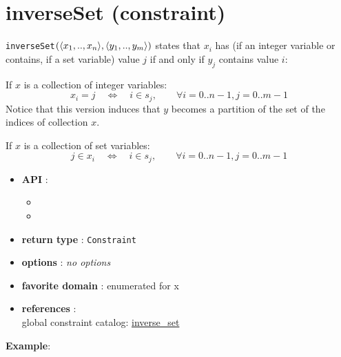 \label{inverseset}
\hypertarget{inverseset}{}

\section{inverseSet (constraint)}\label{inverseset:inversesetconstraint}\hypertarget{inverseset:inversesetconstraint}{}
\begin{notedef}
  \texttt{inverseSet}$(\langle x_1,..,x_n\rangle,\langle y_1,..,y_m\rangle)$ states
that $x_i$ has (if an integer variable or contains, if a set variable) value $j$ if and only if $y_j$ contains value $i$:

If $x$ is a collection of integer variables:
$$x_i = j\quad\iff\quad i\in s_j,\qquad\forall i=0..n-1,j=0..m-1$$
Notice that this version induces that $y$ becomes a partition of the set of the indices of collection $x$.


If $x$ is a collection of set variables:
$$j \in x_i \quad\iff\quad i\in s_j,\qquad\forall i=0..n-1,j=0..m-1$$




\end{notedef}
\begin{itemize}
	\item \textbf{API} :
	\begin{itemize}
		\item {}
		\item {}
	\end{itemize}
	\item \textbf{return type} : \texttt{Constraint}
	\item \textbf{options} : \emph{no options}
	\item \textbf{favorite domain} : enumerated for x
	\item \textbf{references} :\\
      global constraint catalog: \href{http://www.emn.fr/x-info/sdemasse/gccat/Cinverse_set.html}{inverse\_set}
\end{itemize}

\textbf{Example}:


